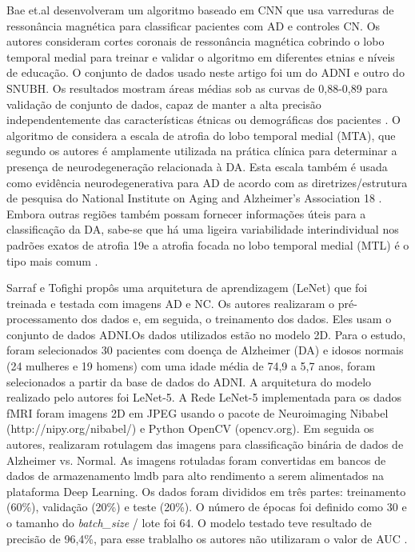 \documentclass[openright]{UFRGS} %
\begin{document}
Bae et.al desenvolveram um algoritmo baseado em CNN que usa varreduras de ressonância magnética para classificar pacientes com AD e controles CN. Os autores consideram cortes coronais de ressonância magnética cobrindo o lobo temporal medial para treinar e validar o algoritmo em diferentes etnias e níveis de educação. O conjunto de dados usado neste artigo foi um do ADNI e outro do SNUBH. Os resultados mostram áreas médias sob as curvas de 0,88-0,89 para validação de conjunto de dados, capaz de manter a alta precisão independentemente das características étnicas ou demográficas dos pacientes \cite{bae2020identification}. O algoritmo de  \cite{bae2020identification} considera a escala de atrofia do lobo 
temporal medial (MTA), que segundo os autores é amplamente utilizada na 
prática clínica para determinar a presença de neurodegeneração 
relacionada à DA. Esta escala também é usada como evidência neurodegenerativa para AD de acordo com as diretrizes/estrutura de pesquisa do National 
Institute on Aging and Alzheimer's Association 18 . 
Embora outras regiões também possam fornecer informações 
úteis para a classificação da DA, sabe-se que há uma ligeira
variabilidade interindividual nos padrões exatos de atrofia 19e 
a atrofia focada no 
lobo temporal medial (MTL) é o tipo mais comum \cite{bae2020identification}.


Sarraf e Tofighi propôs uma arquitetura de aprendizagem (LeNet) que foi treinada e testada com imagens AD e NC. Os autores realizaram o pré-processamento dos dados e, em seguida, o treinamento dos dados. Eles usam o conjunto de dados ADNI.Os dados utilizados estão no modelo 2D. 
Para o estudo, foram selecionados 30 pacientes com doença de Alzheimer (DA) e
idosos normais (24 mulheres e 19 homens)  com
uma idade média de 74,9 a 5,7 anos,  foram selecionados a partir da base de dados do ADNI.
A arquitetura do modelo realizado pelo autores foi LeNet-5. A Rede LeNet-5 implementada para  os dados fMRI  foram imagens 2D em JPEG usando o pacote de Neuroimaging Nibabel (http://nipy.org/nibabel/) e Python OpenCV
(opencv.org). Em seguida os autores, realizaram rotulagem  das imagens  para classificação binária de dados de Alzheimer vs. Normal. As imagens rotuladas foram convertidas em bancos de dados de armazenamento lmdb para alto rendimento a serem alimentados na plataforma Deep Learning.
Os dados foram divididos em três partes: treinamento
(60\%), validação (20\%) e teste (20\%). O número de
épocas foi definido como 30 e o tamanho do \textit{batch\_size }/ lote foi 64. O modelo testado  teve resultado de precisão de 96,4\%, para esse trablalho os autores não utilizaram o valor de AUC \cite{sarraf2016classification}.
\end{document}

